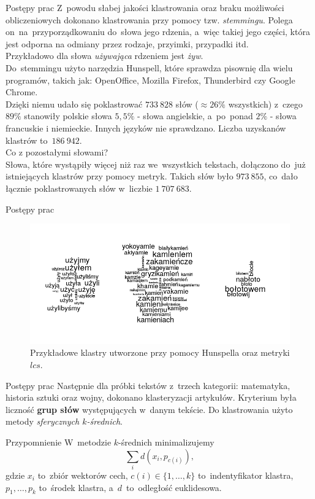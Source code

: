 \documentclass[11pt,pdftex,mathserif]{beamer}\usepackage[]{graphicx}\usepackage[]{color}
\theoremstyle{definition}
\begin{document}
\begin{frame}{Postępy prac}
Z~powodu słabej jakości klastrowania oraz braku możliwości obliczeniowych dokonano klastrowania przy pomocy tzw. \emph{stemmingu}. Polega on~na~przyporządkowaniu do~słowa jego rdzenia, a~więc takiej jego części, która jest odporna na odmiany przez rodzaje, przyimki, przypadki itd.\\
Przykładowo dla słowa \emph{używająca} rdzeniem jest \emph{żyw}.\\
\pause
Do~stemmingu użyto narzędzia Hunspell, które sprawdza pisownię dla wielu programów, takich jak:  OpenOffice, Mozilla Firefox, Thunderbird czy Google Chrome.\\
Dzięki niemu udało się poklastrować $733\ 828$ słów ($\approx 26\%$ wszystkich) z~czego $89\%$ stanowiły polskie słowa $5,5\%$ - słowa angielskie, a~po~ponad $2\%$ - słowa francuskie i niemieckie. Innych języków nie sprawdzano. Liczba uzyskanów klastrów to~$186\ 942$.\\
\pause
Co z pozostałymi słowami?\\
Słowa, które wystąpiły więcej niż raz we~wszystkich tekstach, dołączono do~już istniejących klastrów przy pomocy metryk. Takich słów było $973\ 855$, co~dało łącznie poklastrowanych słów w~liczbie $1\ 707\ 683$.
\end{frame}


\begin{frame}{Postępy prac}
\begin{figure}[h]
      \centering
      \includegraphics[width=12cm] {clust_all2}
      \caption{Przykładowe klastry utworzone przy pomocy Hunspella oraz metryki $lcs$.}
    \end{figure}
\end{frame}


\begin{frame}{Postępy prac}
Następnie dla próbki tekstów z~trzech kategorii: matematyka, historia sztuki oraz wojny, dokonano klasteryzacji artykułów. Kryterium była liczność \textbf{grup słów} występujących w~danym tekście. Do klastrowania użyto metody \emph{sferycznych $k$-średnich}.\\
\pause
\begin{block}{Przypomnienie}
W~metodzie $k$-średnich minimalizujemy
$$
\sum_i d(x_i, p_{c(i)}),
$$
gdzie $x_i$ to~zbiór wektorów cech, $c(i) \in \{1,\ldots,k\}$ to~indentyfikator klastra, $p_1,\ldots,p_k$ to~środek klastra, a~$d$~to~odległość euklidesowa.
\end{block}
\end{frame}
\end{document}
